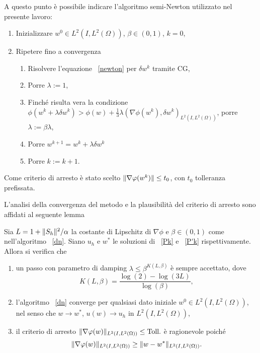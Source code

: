 A questo punto è possibile indicare l'algoritmo semi-Newton utilizzato nel presente lavoro:
\begin{algoritmo}
\label{dn}
\begin{enumerate}
\item Inizializzare $ w^0\in L^2(I,L^2(\Omega)) $, $\beta\in(0,1) $, $ k=0 $, 
\item Ripetere fino a convergenza
          \begin{enumerate}
          \item Risolvere l'equazione ~\eqref{newton} per $ \delta w^k $ tramite CG,
          \item Porre $ \lambda:=1 $,
          \item Finché risulta vera la condizione $ \phi(w^k+\lambda\delta w^k) > \phi(w) + \frac{1}{3}\lambda(\nabla\phi(w^k),\delta w^k)_{L^2(I,L^2(\Omega))} $, porre $ \lambda:=\beta\lambda $,
          \item Porre $ w^{k+1}=w^k + \lambda\delta w^k $
         \item Porre $ k:=k+1 $.
          \end{enumerate}
\end{enumerate}
Come criterio di arresto è stato scelto $ \lVert\nabla\varphi(w^k)\rVert\le t_0 $, con $ t_0 $ tolleranza prefissata.          
\end{algoritmo}
L'analisi della convergenza del metodo e la plausibilità del criterio di arresto sono affidati al seguente lemma
\begin{lemma}
\label{global}
Sia $ L=1+\lVert S_h\rVert^2 /\alpha $ la costante di Lipschitz di $ \nabla\phi $ e $ \beta\in(0,1) $ come nell'algoritmo  ~\eqref{dn}. Siano $ u_h $ e $ w^* $ le soluzioni di ~\eqref{Pk} e ~\eqref{P'k} rispettivamente. Allora si verifica che 
\begin{enumerate}
\item un passo con parametro di damping $ \lambda\le\beta^{K(L,\beta)} $ è sempre accettato, dove
\begin{equation}
K(L,\beta)=\frac{\log(2)-\log(3L)}{\log(\beta)},
\end{equation}
\item l'algoritmo ~\eqref{dn} converge per qualsiasi dato iniziale $ w^0\in L^2(I,L^2(\Omega)) $, nel senso che $ w\to w^* $, $ u(w)\to u_h $ in $ L^2(I,L^2(\Omega)) $,
\item il criterio di arresto $ \lVert\nabla\varphi(w)\rVert_{L^2(I,L^2(\Omega))}\le\text{Toll.} $ è ragionevole poiché
\begin{equation}
\lVert\nabla\varphi(w)\rVert_{L^2(I,L^2(\Omega))}\ge \lVert w-w^*\rVert_{L^2(I,L^2(\Omega))}.
\end{equation}
\end{enumerate}
\end{lemma} 


